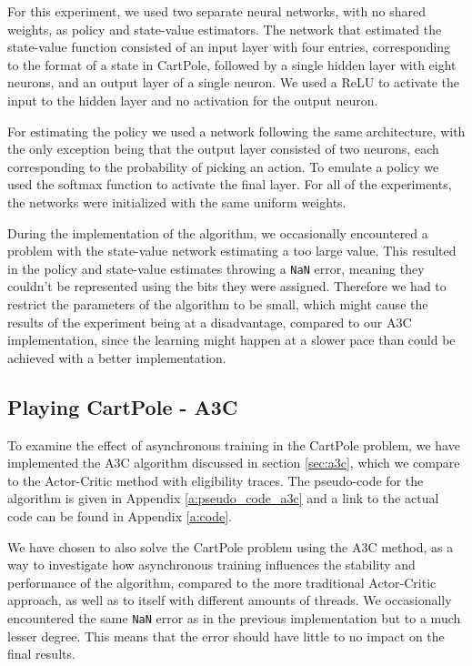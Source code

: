 \documentclass[11pt]{article}
\begin{document}
For this experiment, we used two separate neural networks, with no
shared weights, as policy and state-value estimators.
The network that estimated the state-value function consisted of an
input layer with four entries, corresponding to the format of a state in CartPole,
followed by a single hidden layer with eight neurons, and an output layer of a single
neuron.
We used a ReLU to activate the input to the
hidden layer and no activation for the output neuron.

For estimating the policy we used a network following the same architecture,
with the only exception being that the output layer consisted of two
neurons, each corresponding to the probability of picking an action.
To emulate a policy we used the softmax function
to activate the final layer.
For all of the experiments, the networks were initialized with the same uniform
weights.

During the implementation of the algorithm, we occasionally encountered a problem with the
state-value network estimating a too large value.
This resulted in the policy and state-value estimates throwing a \texttt{NaN} error,
meaning they couldn't be represented using the bits they were assigned.
Therefore we had to restrict the parameters of the algorithm to
be small, which might cause the results of the
experiment being at a disadvantage, compared to our A3C implementation, since the learning
might happen at a slower pace than could be achieved with a better implementation.

\subsection{Playing CartPole - A3C}

To examine the effect of asynchronous training in the CartPole problem,
we have implemented the A3C algorithm discussed in section \ref{sec:a3c},
which we compare to the Actor-Critic method with eligibility traces.
The pseudo-code for the algorithm is given in Appendix \ref{a:pseudo_code_a3c}
and a link to the actual code can be found in Appendix \ref{a:code}.

We have chosen to also solve the CartPole problem using the A3C method, as a way to
investigate how asynchronous training influences the stability and performance of the algorithm,
compared to the more traditional Actor-Critic approach, as well as 
to itself with different amounts of threads.
We occasionally encountered the same \texttt{NaN} error as in the previous implementation
but to a much lesser degree.
This means that the error should have little to no impact on
the final results.
\end{document}
